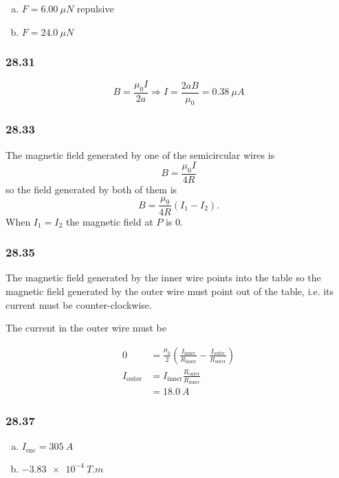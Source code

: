 \documentclass{article}
\begin{document}
\begin{enumerate}[(a)]
  \item $F = \qty{6.00}{\mu N}$ repulsive

  \item $F = \qty{24.0}{\mu N}$
\end{enumerate}

\subsubsection{28.31}

\[B = \frac{\mu_0 I}{2 a} \Rightarrow I = \frac{2 a B}{\mu_0} = \qty{0.38}{\mu A}\]

\subsubsection{28.33}

The magnetic field generated by one of the semicircular wires is \[B = \frac{\mu_0 I}{4 R}\] so the field generated by both of them is \[B = \frac{\mu_0}{4 R} (I_1 - I_2).\] When $I_1 = I_2$ the magnetic field at $P$ is $0$.

\subsubsection{28.35}

The magnetic field generated by the inner wire points into the table so the magnetic field generated by the outer wire must point out of the table, i.e. its current must be counter-clockwise.

The current in the outer wire must be

\begin{align*}
  0                & = \frac{\mu_0}{2} \left( \frac{I_\textrm{inner}}{R_\textrm{inner}} - \frac{I_\textrm{outer}}{R_\textrm{outer}} \right) \\
  I_\textrm{outer} & = I_\textrm{inner} \frac{R_\textrm{outer}}{R_\textrm{inner}}                                                           \\
                   & = \qty{18.0}{A}
\end{align*}

\subsubsection{28.37}

\begin{enumerate}[(a)]
  \item $I_\textrm{enc} = \qty{305}{A}$

  \item $\qty{-3.83e-4}{T.m}$
\end{enumerate}
\end{document}
